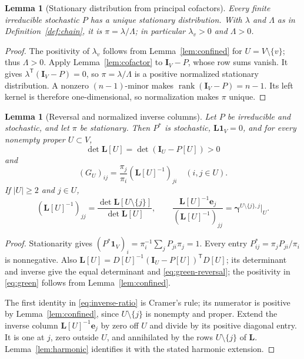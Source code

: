 \documentclass[11pt]{article}
\newtheorem{lemma}[definition]{Lemma}
\newcommand{\one}{\mathbf 1}
\newcommand{\Id}{\mathbf I}
\newcommand{\Lmat}{\mathbf L}
\newcommand{\gam}{\boldsymbol\gamma}
\begin{document}
\begin{lemma}[Stationary distribution from principal cofactors]
\label{lem:stationary}
Every finite irreducible stochastic $P$ has a unique stationary
distribution. With $\lambda$ and $\Lambda$ as in
Definition~\ref{def:chain}, it is $\pi=\lambda/\Lambda$; in particular
$\lambda_v>0$ and $\Lambda>0$.
\end{lemma}
\begin{proof}
The positivity of $\lambda_v$ follows from
Lemma~\ref{lem:confined} for $U=V\setminus\{v\}$;
thus $\Lambda>0$.
Apply Lemma~\ref{lem:cofactor} to $\Id_V-P$, whose row sums
vanish. It gives
$\lambda^{\mathsf T}(\Id_V-P)=0$, so
$\pi=\lambda/\Lambda$ is a positive normalized stationary
distribution. A nonzero $(n-1)$-minor makes
$\operatorname{rank}(\Id_V-P)=n-1$. Its left kernel is therefore
one-dimensional, so normalization makes $\pi$ unique.
\end{proof}

\begin{lemma}[Reversal and normalized inverse columns]
\label{lem:green}
Let $P$ be irreducible and stochastic, and let $\pi$ be stationary.
Then $P^*$ is stochastic, $\Lmat\one_V=0$, and for every nonempty
proper $U\subset V$,
\begin{equation}\label{eq:green}
\det\Lmat[U]=\det(\Id_U-P[U])>0
\end{equation}
and
\begin{equation}\label{eq:green-reversal}
(G_U)_{ij}
=\frac{\pi_j}{\pi_i}(\Lmat[U]^{-1})_{ji}
\quad(i,j\in U).
\end{equation}
If $|U|\geq2$ and $j\in U$,
\begin{equation}\label{eq:inverse-ratio}
(\Lmat[U]^{-1})_{jj}
=\frac{\det\Lmat[U\setminus\{j\}]}{\det\Lmat[U]},
\qquad
\frac{\Lmat[U]^{-1}\mathbf e_j}
     {(\Lmat[U]^{-1})_{jj}}
=\gam^{U\setminus\{j\},j}|_U.
\end{equation}
\end{lemma}
\begin{proof}
Stationarity gives
$(P^*\one_V)_i=\pi_i^{-1}\sum_jP_{ji}\pi_j=1$.
Every entry $P^*_{ij}=\pi_jP_{ji}/\pi_i$ is nonnegative.
Also
$\Lmat[U]=D[U]^{-1}(\Id_U-P[U])^{\mathsf T}D[U]$;
its determinant and inverse give the equal determinant and
\eqref{eq:green-reversal}; the positivity in
\eqref{eq:green} follows from Lemma~\ref{lem:confined}.

The first identity in \eqref{eq:inverse-ratio} is Cramer's rule;
its numerator is positive by Lemma~\ref{lem:confined}, since
$U\setminus\{j\}$ is nonempty and proper.
Extend the inverse column $\Lmat[U]^{-1}\mathbf e_j$ by zero
off $U$ and divide by its positive diagonal entry. It is one
at $j$, zero outside $U$, and annihilated by the rows
$U\setminus\{j\}$ of $\Lmat$. Lemma~\ref{lem:harmonic}
identifies it with the stated harmonic extension.
\end{proof}
\end{document}
